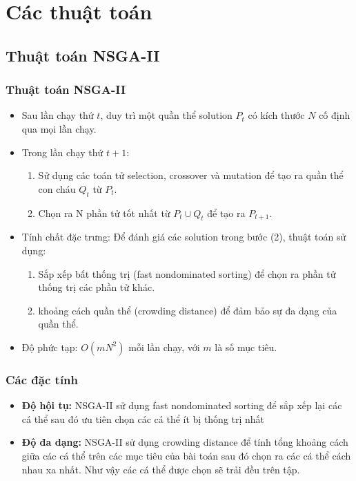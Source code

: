 \documentclass{beamer}
\begin{document}
\section{\textbf{Các thuật toán}}
\subsection{\textbf{Thuật toán NSGA-II}}
    \begin{frame}
    \frametitle{\textbf{Thuật toán NSGA-II}}
        \begin{itemize}
            \item<1-> Sau lần chạy thứ $ t $, duy trì một quần thể solution $ P_t $ có kích thước $ N $ cố định qua mọi lần chạy.
            \item<2-> Trong lần chạy thứ $ t + 1 $:
            \begin{enumerate}
                \item<2-> Sử dụng các toán tử selection, crossover và mutation để tạo ra quần thể con cháu $ Q_t $ từ $ P_t $.
                \item<2-> Chọn ra N phần tử tốt nhất từ $ P_t \cup Q_t $ để tạo ra $ P_{t + 1} $.
            \end{enumerate}
            \item<3-> Tính chất đặc trưng: Để đánh giá các solution trong bước (2), thuật toán sử dụng:
            \begin{enumerate}
                \item<3-> Sắp xếp bất thống trị (fast nondominated sorting) để chọn ra phần tử thống trị các phần tử khác.
                \item<3-> khoảng cách quần thể (crowding distance) để đảm bảo sự đa dạng của quần thể.
            \end{enumerate}
            \item<4-> Độ phức tạp: $ O(mN^2) $ mỗi lần chạy, với $ m $ là số mục tiêu.
        \end{itemize}
    \end{frame}

    \begin{frame}
    \frametitle{\textbf{Các đặc tính}}
        \begin{itemize}
            \item<1-> \textbf{Độ hội tụ:} NSGA-II sử dụng fast nondominated sorting
            để sắp xếp lại các cá thể sau đó ưu tiên chọn các cá thể ít bị thống trị nhất
            \item<2-> \textbf{Độ đa dạng:} NSGA-II sử dụng crowding distance để tính tổng khoảng 
            cách giữa các cá thể trên các mục tiêu của bài toán sau đó chọn ra các cá thể cách nhau 
            xa nhất. Như vậy các cá thể được chọn sẽ trải đều trên tập.
        \end{itemize}
    \end{frame}
\end{document}
